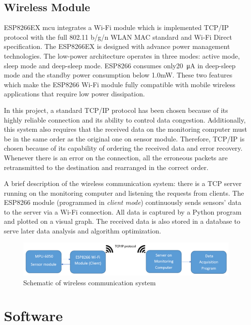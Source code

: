 \documentclass[letterpaper,12pt,titlepage,oneside,final]{book}
\begin{document}
\subsection{Wireless Module}
ESP8266EX \gls{mcu} integrates a Wi-Fi module which is implemented TCP/IP protocol with the full 802.11 b/g/n WLAN MAC standard and Wi-Fi Direct specification. The ESP8266EX is designed with advance power management technologies. The low-power architecture operates in three modes: active mode, sleep mode and deep-sleep mode. ESP8266 consumes only\SI{20}{\micro\ampere} in deep-sleep mode and the standby power consumption below 1.0mW. These two features which make the ESP8266 Wi-Fi module fully compatible with mobile wireless applications that require low power dissipation. \par
In this project, a standard TCP/IP protocol has been chosen because of its highly reliable connection and its ability to control data congestion. Additionally, this system also requires that the received data on the monitoring computer must be in the same order as the original one on sensor module. Therefore, TCP/IP is chosen because of its capability of ordering the received data and error recovery. Whenever there is an error on the connection, all the erroneous packets are retransmitted to the destination and rearranged in the correct order.\par 
A brief description of the wireless communication system: there is a TCP server running on the monitoring computer and listening the requests from clients. The ESP8266 module (programmed in \textit{client mode}) continuously sends sensors' data to the server via a Wi-Fi connection. All data is captured by a Python program and plotted on a visual graph. The received data is also stored in a database to serve later data analysis and algorithm optimization. 
\begin{figure}[h!]
	\centering
	\includegraphics[scale=0.38]{system_schematic}
	\caption{Schematic of wireless communication system}
\end{figure} 
\section{Software}
\end{document}
